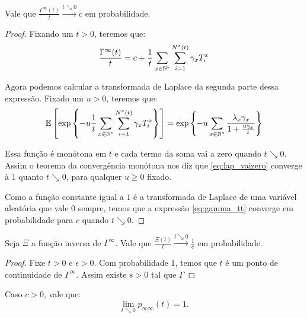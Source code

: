 \begin{lema}
  \label{lema:deriv_gamma}
  Vale que $ \frac{\Gamma^{\infty}(t)}{t} \xrightarrow{t \searrow 0}
  c$ em probabilidade.
\end{lema}
\begin{proof}
  Fixando um $t > 0$, teremos que:
  \begin{equation}
    \label{eq:gamma_tt}
    \frac{\Gamma^{\infty}(t)}{t} = 
    c + \frac{1}{t} \sum_{x \in {\mathbb{N^*}}} \sum_{i = 1}^{N^x(t)}
    \gamma_x T^x_i
  \end{equation}

  Agora podemos calcular a transformada de Laplace da segunda parte
  dessa expressão. Fixado um $u > 0$, teremos que:
  \begin{equation}
    \label{eq:lap_vaizero}
    \E \left[ \exp\left\{
      -u \frac{1}{t} \sum_{x \in \Nz} \sum_{i=1}^{N^x(t)} \gamma_x T^x_i
    \right\} \right] =
    \exp \left\{
      - u \sum_{x \in \Nz}  \frac{\lambda_x \gamma_x}{1 +
        \frac{u \gamma_x}{t}}
    \right\} %
  \end{equation}

  Essa função é monótona em $t$ e cada termo da soma
  vai a zero quando $t \searrow 0$.  Assim o teorema da convergência
  monótona nos diz que \eqref{eq:lap_vaizero} converge à $1$ quanto $t
  \searrow 0$, para qualquer $u \geq 0$ fixado.

  Como a função constante igual a $1$ é a transformada de Laplace de
  uma variável aleatória que vale $0$ sempre, temos que a expressão
  \eqref{eq:gamma_tt} converge em probabilidade para $c$ quando $t
  \searrow 0$.
\end{proof}

\begin{lema}
  \label{lema:deriv_inv_gamma}
  Seja $\Xi$  a função inversa de $\Gamma^\infty$.
  Vale que $ \frac{\Xi(t)}{t} \xrightarrow{t \searrow 0}
  \frac{1}{c}$ em probabilidade.
\end{lema}
\begin{proof}

  Fixe $t > 0$ e $\epsilon > 0$. Com probabilidade $1$, temos que $t$
  é um ponto de continuidade de $\Gamma^\infty$. Assim existe $s > 0$
  tal que $\Gamma$

\end{proof}

\begin{proposicao}
  \label{prop:continuidade}
  Caso $c > 0$, vale que:
  \begin{displaymath}
    \lim_{t \searrow 0}p_{\infty \infty}(t) = 1.    
  \end{displaymath}
\end{proposicao}

